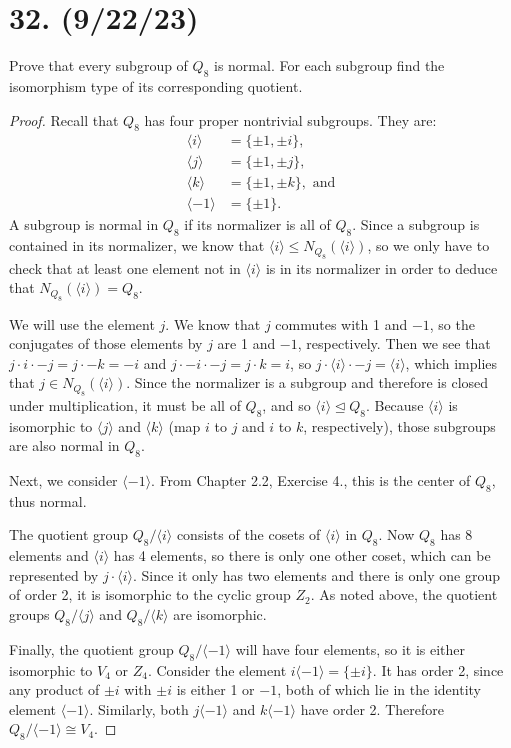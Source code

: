 \documentclass{article}
\begin{document}
\section*{32. (9/22/23)}

Prove that every subgroup of $Q_8$ is normal. For each subgroup find the isomorphism type of its corresponding quotient.

\begin{proof}
    Recall that $Q_8$ has four proper nontrivial subgroups. They are: 
    \begin{align*}
        \langle i \rangle &= \{ \pm{1}, \pm{i} \}, \\
        \langle j \rangle &= \{ \pm{1}, \pm{j} \}, \\
        \langle k \rangle &= \{ \pm{1}, \pm{k} \}, \text{ and} \\
        \langle -1 \rangle &= \{ \pm{1} \}.
    \end{align*}
    A subgroup is normal in $Q_8$ if its normalizer is all of $Q_8$. Since a subgroup is contained in its normalizer, we know that $\langle i \rangle \leq N_{Q_8}(\langle i \rangle)$, so we only have to check that at least one element not in $\langle i \rangle$ is in its normalizer in order to deduce that $N_{Q_8}(\langle i \rangle) = Q_8$.

    We will use the element $j$. We know that $j$ commutes with 1 and $-1$, so the conjugates of those elements by $j$ are 1 and $-1$, respectively. Then we see that $j \cdot i \cdot -j = j \cdot -k = -i$ and $j \cdot -i \cdot -j = j \cdot k = i$, so $j \cdot \langle i \rangle \cdot -j = \langle i \rangle$, which implies that $j \in N_{Q_8}(\langle i \rangle)$. Since the normalizer is a subgroup and therefore is closed under multiplication, it must be all of $Q_8$, and so $\langle i \rangle \unlhd Q_8$. Because $\langle i \rangle$ is isomorphic to $\langle j \rangle$ and $\langle k \rangle$ (map $i$ to $j$ and $i$ to $k$, respectively), those subgroups are also normal in $Q_8$.

    Next, we consider $\langle -1 \rangle$. From Chapter 2.2, Exercise 4., this is the center of $Q_8$, thus normal.

    The quotient group $Q_8/\langle i \rangle$ consists of the cosets of $\langle i \rangle$ in $Q_8$. Now $Q_8$ has 8 elements and $\langle i \rangle$ has 4 elements, so there is only one other coset, which can be represented by $j \cdot \langle i \rangle$. Since it only has two elements and there is only one group of order 2, it is isomorphic to the cyclic group $Z_2$. As noted above, the quotient groups $Q_8/\langle j \rangle$ and $Q_8/\langle k \rangle$ are isomorphic.

    Finally, the quotient group $Q_8/\langle -1 \rangle$ will have four elements, so it is either isomorphic to $V_4$ or $Z_4$. Consider the element $i \langle -1 \rangle = \{ \pm{i} \}$. It has order 2, since any product of $\pm{i}$ with $\pm{i}$ is either 1 or $-1$, both of which lie in the identity element $\langle -1 \rangle$. Similarly, both $j \langle -1 \rangle$ and $k \langle -1 \rangle$ have order 2. Therefore $Q_8/\langle -1 \rangle \cong V_4$.
\end{proof}
\end{document}

